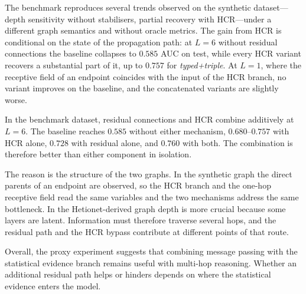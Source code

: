 The benchmark reproduces several trends
observed on the synthetic dataset---depth sensitivity without stabilisers,
partial recovery with HCR---under a different graph semantics and without
oracle metrics. The gain from HCR is conditional on the state of the
propagation path: at $L=6$ without
residual connections the baseline collapses to $0.585$ AUC on test, while every
HCR variant recovers a substantial part of it, up to $0.757$ for
\emph{typed+triple}. At $L=1$, where the receptive field of an endpoint
coincides with the input of the HCR branch, no variant improves on the
baseline, and the concatenated variants are slightly worse.

In the benchmark dataset, residual connections and HCR combine additively at
$L=6$. The baseline
reaches $0.585$ without either mechanism, $0.680$--$0.757$ with HCR alone,
$0.728$ with residual alone, and $0.760$ with both. The combination is
therefore better than either component in isolation.

The reason is the structure of the two graphs. In the synthetic graph the direct
parents of an endpoint are observed, so the HCR branch and the one-hop
receptive field read the same variables and the two mechanisms address the same
bottleneck. In the Hetionet-derived graph depth is more crucial because some
layers are latent. Information must
therefore traverse several hops, and the residual path and the HCR bypass
contribute at different points of that route.

Overall, the proxy experiment suggests that combining message passing
with the statistical evidence branch remains useful with 
multi-hop reasoning. Whether an
additional residual path helps or hinders depends on where 
the statistical
evidence enters the model.


